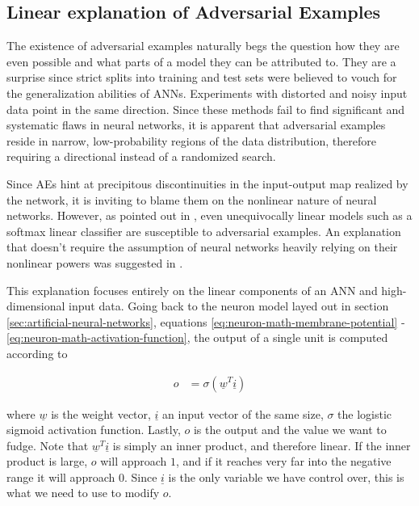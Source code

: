 \documentclass[11pt, a4paper]{article}
\newcommand\braces[1]{\left(#1\right)}
\renewcommand{\vec}[1]{\underline{#1}}
\begin{document}
\subsection{Linear explanation of Adversarial Examples}
\label{subsec:ae-linear-explanation}
The existence of adversarial examples naturally begs the question how they are even possible and what parts of a model they can be attributed to. They are a surprise since strict splits into training and test sets were believed to vouch for the generalization abilities of ANNs. Experiments with distorted and noisy input data point in the same direction. Since these methods fail to find significant and systematic flaws in neural networks, it is apparent that adversarial examples reside in narrow, low-probability regions of the data distribution, therefore requiring a directional instead of a randomized search.

Since AEs hint at precipitous discontinuities in the input-output map realized by the network, it is inviting to blame them on the nonlinear nature of neural networks. However, as pointed out in \cite{breaking-linear-classifiers-on-imgagenet}, even unequivocally linear models such as a softmax linear classifier are susceptible to adversarial examples. An explanation that doesn't require the assumption of neural networks heavily relying on their nonlinear powers was suggested in \cite{explaining-and-harnessing-adversarial-examples}.

This explanation focuses entirely on the linear components of an ANN and high-dimensional input data. Going back to the neuron model layed out in section \ref{sec:artificial-neural-networks}, equations \eqref{eq:neuron-math-membrane-potential} - \eqref{eq:neuron-math-activation-function}, the output of a single unit is computed according to

\begin{align}
	o &= \sigma \braces{\vec{w}^T \vec{i}}
\end{align}

where $\vec{w}$ is the weight vector, $\vec{i}$ an input vector of the same size, $\sigma$ the logistic sigmoid activation function. Lastly, $o$ is the output and the value we want to fudge. Note that $\vec{w}^T \vec{i}$ is simply an inner product, and therefore linear. If the inner product is large, $o$ will approach $1$, and if it reaches very far into the negative range it will approach $0$. Since $\vec{i}$ is the only variable we have control over, this is what we need to use to modify $o$.
\end{document}

